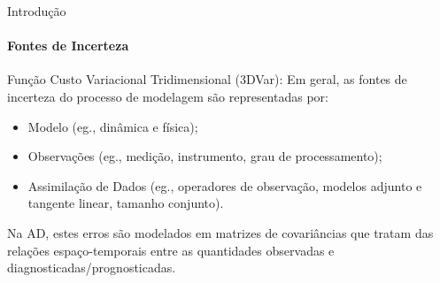 \documentclass[10pt,aspectratio=169]{beamer}
\begin{document}
\begin{frame}[fragile]{Introdução}
\framesubtitle{Fontes de Incerteza}
  \begin{block}{Função Custo Variacional Tridimensional (3DVar):}
  \vspace{0.5em}
  Em geral, as fontes de incerteza do processo de modelagem são representadas por:
  \begin{itemize}
    \item Modelo (eg., dinâmica e física);
    \item Observações (eg., medição, instrumento, grau de processamento);
    \item Assimilação de Dados (eg., operadores de observação, modelos adjunto e tangente linear, tamanho conjunto).
  \end{itemize}
  \pause
  \vspace{0.5em}
  Na AD, estes erros são modelados em matrizes de covariâncias que tratam das relações espaço-temporais entre as quantidades observadas e diagnosticadas/prognosticadas.
\end{block}
  \vspace{0.5cm}
  
  
\end{frame}
\end{document}
